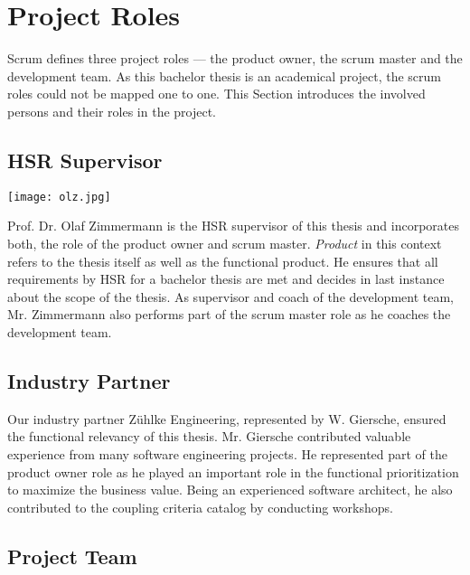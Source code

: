 \clearpage
\section{Project Roles}

Scrum defines three project roles — the product owner, the scrum master and the development
team. As this bachelor thesis is an academical project, the scrum roles could
not be mapped one to one. This Section introduces the involved persons and their roles
in the project.

\subsection{HSR Supervisor}

\begin{minipage}[t]{0.25\textwidth}
	\vspace{0pt}
	\texttt{[image: olz.jpg]}
\end{minipage}
\begin{minipage}[t]{0.8\textwidth}
	\vspace{10pt}
	Prof. Dr. Olaf Zimmermann is the \gls{HSR} supervisor of this thesis and incorporates both, the role of the product owner and scrum master. \textit{Product} in this context refers to the thesis itself as well as the functional product. He ensures that all requirements by HSR for a bachelor thesis are met and decides in last instance about the scope of the thesis. 
	As supervisor and coach of the development team, Mr. Zimmermann also performs part of the scrum master role as he coaches the development team.
\end{minipage}


\subsection{Industry Partner}

Our industry partner Zühlke Engineering, represented by W. Giersche, ensured the functional relevancy of this thesis. Mr. Giersche contributed valuable experience from many software engineering projects. He represented part of the product owner role as he played an important role in the functional prioritization to maximize the business value. Being an experienced software architect, he also contributed to the coupling criteria catalog by conducting workshops.


\subsection{Project Team}

